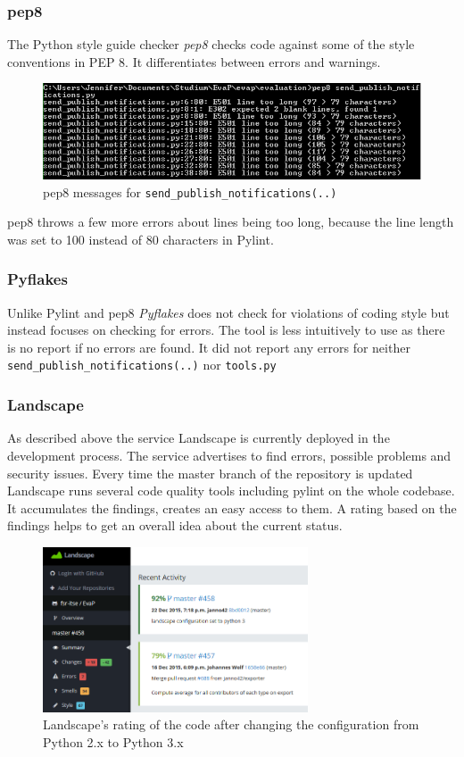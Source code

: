 \subsubsection{pep8}
The Python style guide checker \emph{pep8} checks code against some of the style conventions in PEP 8.
It differentiates between errors and warnings.
\begin{figure}[h]
    \centering
    \includegraphics[width=\textwidth, keepaspectratio]{graphics/pep8_send_publish_notifications_1}
    \caption{pep8 messages for \texttt{send\_publish\_notifications(..)}}
    \label{fig:pep8}
\end{figure} 
pep8 throws a few more errors about lines being too long, because the line length was set to 100 instead of 80 characters in Pylint.

\subsubsection{Pyflakes}
Unlike Pylint and pep8 \emph{Pyflakes} does not check for violations of coding style but instead focuses on checking for errors.
The tool is less intuitively to use as there is no report if no errors are found. 
It did not report any errors for neither \texttt{send\_publish\_notifications(..)} nor \texttt{tools.py}

\subsubsection{Landscape}
As described above the service Landscape is currently deployed in the development process. 
The service advertises to find errors, possible problems and security issues.
Every time the master branch of the repository is updated Landscape runs several code quality tools including pylint on the whole codebase. 
It accumulates the findings, creates an easy access to them.
A rating based on the findings helps to get an overall idea about the current status.

\begin{figure}[h]
    \centering
    \includegraphics[width=0.7\textwidth, keepaspectratio]{graphics/landscape_python3}
    \caption{Landscape's rating of the code after changing the configuration from Python 2.x to Python 3.x}
    \label{fig:landscape_python3}
\end{figure} 

